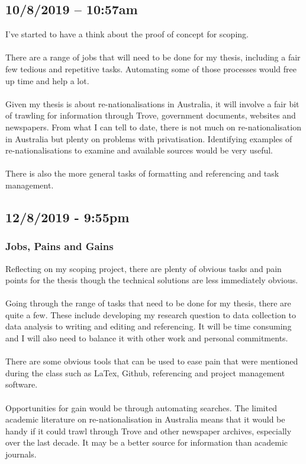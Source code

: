 \documentclass{article}
\begin{document}
\subsection*{10/8/2019 – 10:57am}
I’ve started to have a think about the proof of concept for scoping.\\\\
There are a range of jobs that will need to be done for my thesis, including a fair few tedious and repetitive tasks. Automating some of those processes would free up time and help a lot.\\\\
Given my thesis is about re-nationalisations in Australia, it will involve a fair bit of trawling for information through Trove, government documents, websites and newspapers. From what I can tell to date, there is not much on re-nationalisation in Australia but plenty on problems with privatisation. Identifying examples of re-nationalisations to examine and available sources would be very useful.\\\\
There is also the more general tasks of formatting and referencing and task management.

\subsection*{12/8/2019 - 9:55pm}
\subsubsection*{Jobs, Pains and Gains }
Reflecting on my scoping project, there are plenty of obvious tasks and pain points for the thesis though the technical solutions are less immediately obvious.\\\\
Going through the range of tasks that need to be done for my thesis, there are quite a few. These include developing my research question to data collection to data analysis to writing and editing and referencing. It will be time consuming and I will also need to balance it with other work and personal commitments.\\\\
There are some obvious tools that can be used to ease pain that were mentioned during the class such as LaTex, Github, referencing and project management software.\\\\
Opportunities for gain would be through automating searches. The limited academic literature on re-nationalisation in Australia means that it would be handy if it could trawl through Trove and other newspaper archives, especially over the last decade. It may be a better source for information than academic journals.
\end{document}
